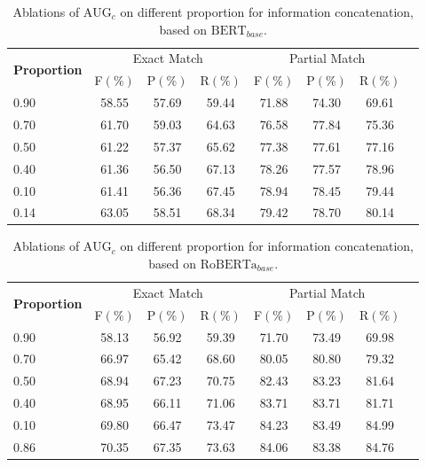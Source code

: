 \documentclass[a4paper,fleqn,twocolumn]{cas-dc}
\newcommand{\1}[1]{\mathds{1}\left[#1\right]}
\begin{document}
\begin{table}[H] 
	\caption{Ablations of $\text{AUG}_{c}$ on different proportion for information concatenation, based on $\text{BERT}_{base}$.} 
	\label{tab:different_ratio_bert}
	\begin{tabular*}{\textwidth}{@{\extracolsep{\fill}}lccccccc}
		\toprule
		\multirow{2}{*}{\textbf{Proportion}} & \multicolumn{3}{c}{Exact Match} & \multicolumn{3}{c}{Partial Match}  \\
		\cline{2-7} 
		\addlinespace
		& F\((\%)\) & P\((\%)\) & R\((\%)\) & F\((\%)\) & P\((\%)\) & R\((\%)\) \\
		\midrule
		0.90 & 58.55 & 57.69 & 59.44 & 71.88 & 74.30 & 69.61 \\ 
		0.70 & 61.70 & 59.03 & 64.63 & 76.58 & 77.84 & 75.36 \\
		0.50 & 61.22 & 57.37 & 65.62 & 77.38 & 77.61 & 77.16 \\
		0.40 & 61.36 & 56.50 & 67.13 & 78.26 & 77.57 & 78.96 \\
		0.10 & 61.41 & 56.36 & 67.45 & 78.94 & 78.45 & 79.44 \\
		0.14 & 63.05 & 58.51 & 68.34 & 79.42 & 78.70 & 80.14 \\
		\bottomrule
	\end{tabular*}      
\end{table}



\begin{table}[H] 
	\caption{Ablations of $\text{AUG}_{c}$ on different proportion for information concatenation, based on $\text{RoBERTa}_{base}$.} 
	\label{tab:different_ratio_roberta}
	\begin{tabular*}{\textwidth}{@{\extracolsep{\fill}}lccccccc}
		\toprule
		\multirow{2}{*}{\textbf{Proportion}} & \multicolumn{3}{c}{Exact Match} & \multicolumn{3}{c}{Partial Match}  \\
		\cline{2-7} 
		\addlinespace
		& F\((\%)\) & P\((\%)\) & R\((\%)\) & F\((\%)\) & P\((\%)\) & R\((\%)\) \\
		\midrule
		0.90 & 58.13 & 56.92 & 59.39 & 71.70 & 73.49 & 69.98 \\ 
		0.70 & 66.97 & 65.42 & 68.60 & 80.05 & 80.80 & 79.32 \\
		0.50 & 68.94 & 67.23 & 70.75 & 82.43 & 83.23 & 81.64 \\
		0.40 & 68.95 & 66.11 & 71.06 & 83.71 & 83.71 & 81.71 \\
		0.10 & 69.80 & 66.47 & 73.47 & 84.23 & 83.49 & 84.99 \\
		0.86 & 70.35 & 67.35 & 73.63 & 84.06 & 83.38 & 84.76 \\
		\bottomrule
	\end{tabular*}      
\end{table}
\end{document}
